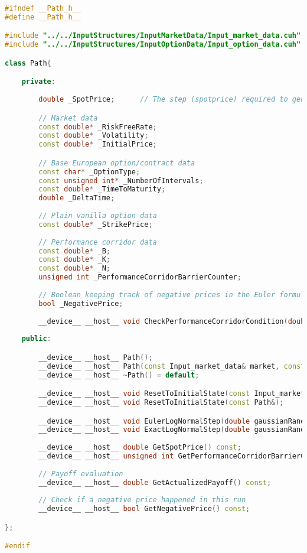 \begin{lstlisting}[language=C++, caption={\texttt{libraries/CoreLibraries/Path/Path.cuh}}]
#ifndef __Path_h__
#define __Path_h__

#include "../../InputStructures/InputMarketData/Input_market_data.cuh"
#include "../../InputStructures/InputOptionData/Input_option_data.cuh"

class Path{

	private:
		
		double _SpotPrice;		// The step (spotprice) required to generate the next one

		// Market data
		const double* _RiskFreeRate;
		const double* _Volatility;
		const double* _InitialPrice;

		// Base European option/contract data
		const char* _OptionType;
		const unsigned int* _NumberOfIntervals;
		const double* _TimeToMaturity;
		double _DeltaTime;
		
		// Plain vanilla option data
		const double* _StrikePrice;
		
		// Performance corridor data
		const double* _B;
		const double* _K;
		const double* _N;
		unsigned int _PerformanceCorridorBarrierCounter;
		
		// Boolean keeping track of negative prices in the Euler formula
		bool _NegativePrice;
		
		__device__ __host__ void CheckPerformanceCorridorCondition(double currentSpotPrice, double nextSpotPrice);
		
	public:

		__device__ __host__ Path();
		__device__ __host__ Path(const Input_market_data& market, const Input_option_data& option);
		__device__ __host__ ~Path() = default;

		__device__ __host__ void ResetToInitialState(const Input_market_data& market, const Input_option_data& option);
		__device__ __host__ void ResetToInitialState(const Path&);

		__device__ __host__ void EulerLogNormalStep(double gaussianRandomVariable);
		__device__ __host__ void ExactLogNormalStep(double gaussianRandomVariable);
		
		__device__ __host__ double GetSpotPrice() const;
		__device__ __host__ unsigned int GetPerformanceCorridorBarrierCounter() const;
		
		// Payoff evaluation
		__device__ __host__ double GetActualizedPayoff() const;
		
		// Check if a negative price happened in this run
		__device__ __host__ bool GetNegativePrice() const;

};

#endif
\end{lstlisting}

